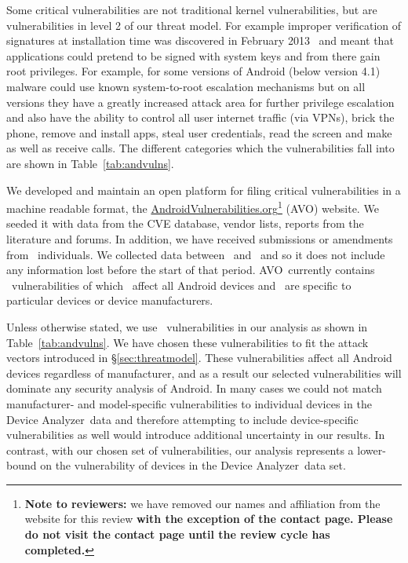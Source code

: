 \documentclass{llncs}
\newcommand{\da}{Device Analyzer}
\newcommand{\avo}{AVO}
\begin{document}
Some critical vulnerabilities are not traditional kernel vulnerabilities, but are vulnerabilities in level 2 of our threat model. For example improper verification of signatures at installation time was discovered in February 2013~\cite{Forristal2013} and meant that applications could pretend to be signed with system keys and from there gain root privileges. For example, for some versions of Android (below version 4.1) malware could use known system-to-root escalation mechanisms but on all versions they have a greatly increased attack area for further privilege escalation and also have the ability to control all user internet traffic (via VPNs), brick the phone, remove and install apps, steal user credentials, read the screen and make as well as receive calls.
The different categories which the vulnerabilities fall into are shown in Table~\ref{tab:andvulns}.
\avoTabAndVulns

We developed and maintain an open platform for filing critical vulnerabilities in a machine readable format, the \href{http://androidvulnerabilities.org/}{AndroidVulnerabilities.org}\footnote{\textbf{Note to reviewers:} we have removed our names and affiliation from the website for this review \textbf{with the exception of the contact page. Please do not visit the contact page until the review cycle has completed.}\vspace{-4em}} (\avo) website.
We seeded it with data from the CVE database, vendor lists, reports from the literature and forums.
In addition, we have received submissions or amendments from \avoNumSubmitters\ individuals.
We collected data between \avoStartDate\ and \avoEndDate\ and so it does not include any information lost before the start of that period.
\avo\ currently contains \avoNumVulnerabilities\ vulnerabilities of which \avoNumVulnAllAndroid\ affect all Android devices and \avoNumVulnSpecific\ are specific to particular devices or device manufacturers.

Unless otherwise stated, we use \daNumVulnsUsed\ vulnerabilities in our analysis as shown in Table~\ref{tab:andvulns}.
We have chosen these vulnerabilities to fit the attack vectors introduced in \S\ref{sec:threatmodel}.
These vulnerabilities affect all Android devices regardless of manufacturer, and as a result our selected vulnerabilities will dominate any security analysis of Android.
In many cases we could not match manufacturer- and model-specific vulnerabilities to individual devices in the \da\ data and therefore attempting to include device-specific vulnerabilities as well would introduce additional uncertainty in our results.
In contrast, with our chosen set of vulnerabilities, our analysis represents a lower-bound on the vulnerability of devices in the \da\ data set.
\end{document}
